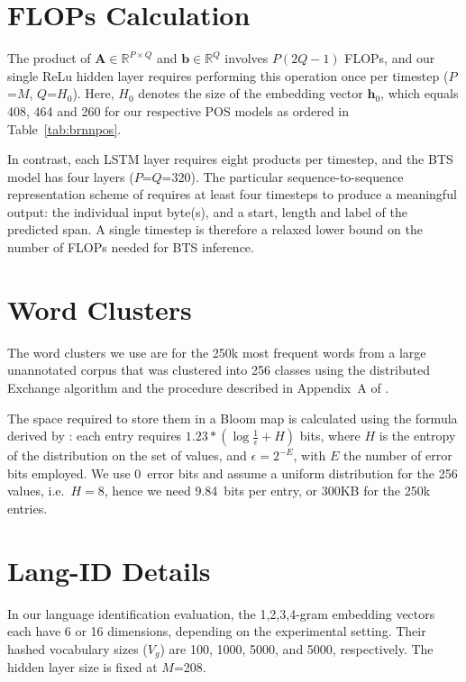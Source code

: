 \documentclass[11pt,letterpaper]{article}
\begin{document}
\section{FLOPs Calculation}\label{sec:flop-detail}
The product of $\mathbf{A} \in \mathbb{R}^{P \times Q}$ and $\mathbf{b} \in \mathbb{R}^Q$ involves \mbox{$P(2Q-1)$} FLOPs, and our single ReLu hidden layer requires performing this operation once per timestep ($P$=$M$, $Q$=$H_0$).
Here, $H_0$ denotes the size of the embedding vector $\mathbf{h}_0$, which equals 408, 464 and 260 for our respective POS models as ordered in Table~\ref{tab:brnnpos}.

In contrast, each LSTM layer requires eight products per timestep, and the BTS model has four layers ($P$=$Q$=320).
The particular sequence-to-sequence representation scheme of  requires at least four timesteps to produce a meaningful output: the individual input byte(s), and a start, length and label of the predicted span.
A single timestep is therefore a relaxed lower bound on the number of FLOPs needed for BTS inference.

\section{Word Clusters}
The word clusters we use are for the 250k most frequent words from a large unannotated corpus that was clustered into 256 classes using the distributed Exchange algorithm \cite{uszkoreit2008distributed} and the procedure described in Appendix~A of .

The space required to store them in a Bloom map is calculated using the formula derived by : each entry requires
 $1.23*(\log\frac{1}{\epsilon} + H)$ bits, where $H$ is the entropy of the distribution on the set of values, and $\epsilon=2^{-E}$, with $E$ the number of error bits employed.
We use 0~error bits and assume a uniform distribution for the 256 values, i.e.\ $H=8$, hence we need 9.84~bits per entry, or 300KB for the 250k entries.

\section{Lang-ID Details}
In our language identification evaluation, the 1,2,3,4-gram embedding vectors each have 6 or 16 dimensions, depending on the experimental setting.
Their hashed vocabulary sizes ($V_g$) are 100, 1000, 5000, and 5000, respectively. 
The hidden layer size is fixed at $M$=208.
\end{document}

